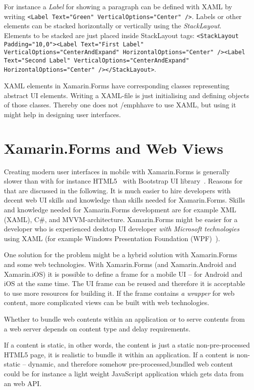 \documentclass[conference]{IEEEtran}
\newcommand{\code}[1]{\texttt{#1}}
\begin{document}
For instance a \emph{Label} for showing a paragraph can be defined with XAML by writing \code{<Label Text="Green" VerticalOptions="Center" />}. Labels or other elements can be stacked horizontally or vertically using the \emph{StackLayout}. Elements to be stacked are just placed inside StackLayout tags: \code{<StackLayout Padding="10,0"><Label Text="First Label" VerticalOptions="CenterAndExpand" HorizontalOptions="Center" /><Label Text="Second Label" VerticalOptions="CenterAndExpand" HorizontalOptions="Center" /></StackLayout>}.

XAML elements in Xamarin.Forms have corresponding classes representing abstract UI elements. Writing a XAML-file is just initialising and defining objects of those classes. Thereby one does not /emph{have to} use XAML, but using it might help in designing user interfaces.

\section{Xamarin.Forms and Web Views}

Creating modern user interfaces in mobile with Xamarin.Forms is generally slower than with for instance HTML5~\cite{html5} with Bootstrap UI library~\cite{bootstrap}. Reasons for that are discussed in the following. It is much easier to hire developers with decent web UI skills and knowledge than skills needed for Xamarin.Forms. Skills and knowledge needed for Xamarin.Forms development are for example XML (XAML), C\#, and MVVM-architecture. Xamarin.Forms might be easier for a developer who is experienced desktop UI developer \emph{with Microsoft technologies} using XAML (for example Windows Presentation Foundation (WPF)~\cite{wpf}).

One solution for the problem might be a hybrid solution with Xamarin.Forms and some web technologies. With Xamarin.Forms (and Xamarin.Android and Xamarin.iOS) it is possible to define a frame for a mobile UI -- for Android and iOS at the same time. The UI frame can be reused and therefore it is acceptable to use more resources for building it. If the frame contains \emph{a wrapper} for web content, more complicated views can be built with web technologies.

Whether to bundle web contents within an application or to serve contents from a web server depends on content type and delay requirements.

If a content is static, in other words, the content is just a static non-pre-processed HTML5 page, it is realistic to bundle it within an application. If a content is non-static -- dynamic, and therefore somehow pre-processed,bundled web content could be for instance a light weight JavaScript application which gets data from an web API.
\end{document}
